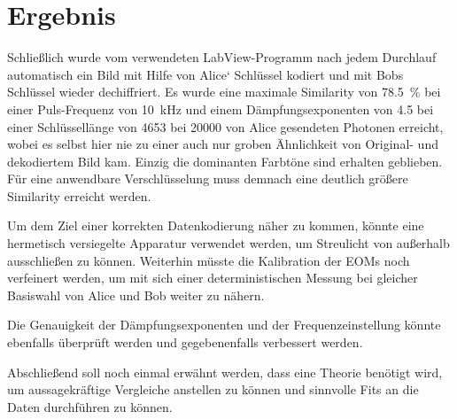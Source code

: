 \section{Ergebnis}

Schließlich wurde vom verwendeten LabView-Programm nach jedem Durchlauf
automatisch ein Bild mit Hilfe von Alice‘ Schlüssel kodiert und mit Bobs
Schlüssel wieder dechiffriert. Es wurde eine maximale Similarity von 
\SI{78,5}{\percent} bei einer Puls-Frequenz von \SI{10}{kHz} und einem 
Dämpfungsexponenten von \SI{4,5}{} bei einer Schlüssellänge von 4653 bei
\SI{20000}{} von Alice gesendeten Photonen erreicht, wobei es selbst hier nie zu einer auch nur
groben Ähnlichkeit von Original- und dekodiertem Bild kam. Einzig die dominanten
Farbtöne sind erhalten geblieben. Für eine anwendbare Verschlüsselung muss
demnach eine deutlich größere Similarity erreicht werden.

Um dem Ziel einer korrekten Datenkodierung näher zu kommen, könnte eine hermetisch versiegelte Apparatur
verwendet werden, um Streulicht von außerhalb ausschließen zu können. Weiterhin
müsste die Kalibration der EOMs noch verfeinert werden, um mit sich einer
deterministischen Messung bei gleicher Basiswahl von Alice und Bob weiter zu
nähern. 

Die Genauigkeit der Dämpfungsexponenten und der Frequenzeinstellung könnte
ebenfalls überprüft werden und gegebenenfalls verbessert werden.

Abschließend soll noch einmal erwähnt werden, dass eine Theorie benötigt wird,
um aussagekräftige Vergleiche anstellen zu können und sinnvolle Fits an die
Daten durchführen zu können. 